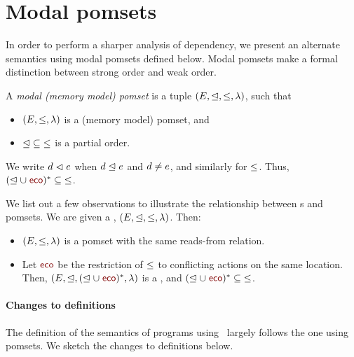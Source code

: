 
\section{Modal pomsets}
In order to perform a sharper analysis of dependency, we present an alternate
semantics using modal pomsets defined below.  Modal pomsets make a formal
distinction between strong order and weak order.
\begin{definition}
  A \emph{modal (memory model) pomset} is a tuple
  $(E, {\trianglelefteq}, {\leq},
  \lambda)$, such that
  \begin{itemize}
   \item $(E, {\leq},
  \lambda)$ is a (memory model) pomset, and 
\item ${\trianglelefteq} \subseteq {\leq}$ is a partial order. 
  \end{itemize}
\end{definition}
We write $d\vartriangleleft e$ when $d\trianglelefteq e$ and $d\neq e$, and similarly for $\leq$.   Thus, $(\sle \cup \reco)^{*} \subseteq {\gtN}$.  

We list out a few observations to illustrate the relationship between \tvalpom s and pomsets.  We are given a  \tvalpom, 
  $(E, {\trianglelefteq}, {\leq}, \lambda)$.  Then:
\begin{itemize}
\item $(E, {\leq},\lambda)$ is a pomset with the same reads-from relation.  

\item Let $\reco$ be the restriction of $\leq$ to conflicting actions on the same location.  Then, $(\Event, {\sle}, (\sle \cup \reco)^{*}, \labeling)$ is a \tvalpom, and $(\sle \cup \reco)^{*} \subseteq {\gtN}$.
\end{itemize}

\paragraph*{Changes to definitions}
The definition of the semantics of programs using \tvalpom\ largely follows the one using pomsets.  We sketch the changes to definitions below.

